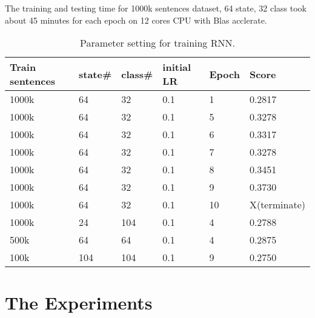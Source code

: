 \documentclass[]{article}
\begin{document}
The training and testing time for 1000k sentences dataset, 64 state, 32 class took about 45 minutes for each epoch on 12 cores CPU with Blas acclerate.
\begin{table}
\begin{center}
\begin{tabular}{ |l|l|l|l|l|l| }
\hline
Train sentences & state\# & class\# & initial LR & Epoch & Score\\ \hline
1000k & 64 & 32 & 0.1 & 1 & 0.2817\\ \hline
1000k & 64 & 32 & 0.1 & 5 & 0.3278\\ \hline
1000k & 64 & 32 & 0.1 & 6 & 0.3317\\ \hline
1000k & 64 & 32 & 0.1 & 7 & 0.3278\\ \hline
1000k & 64 & 32 & 0.1 & 8 & 0.3451\\ \hline
1000k & 64 & 32 & 0.1 & 9 & 0.3730\\ \hline
1000k & 64 & 32 & 0.1 & 10 & X(terminate)\\ \hline
1000k & 24 & 104 & 0.1 & 4 & 0.2788\\ \hline
500k & 64 & 64 & 0.1 & 4 & 0.2875\\ \hline
100k & 104 & 104 & 0.1 & 9 & 0.2750\\ \hline

\end{tabular}
\caption{Parameter setting for training RNN.}
\label{tb:par_for_train}
\end{center}
\end{table}

\section{The Experiments}
\end{document}
